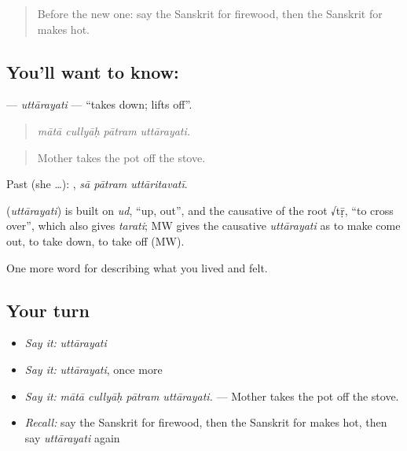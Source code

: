 \label{lesson:SA-C511-uttarayati}



\begin{quote}
Before the new one: say the Sanskrit for firewood, then the Sanskrit for makes hot.
\end{quote}

\subsection*{You'll want to know: }
\textbf{} — \emph{uttārayati} — \textquotedblleft{}takes down; lifts off\textquotedblright{}.

\begin{quote}
   
\end{quote}

\begin{quote}
\emph{mātā cullyāḥ pātram uttārayati.}
\end{quote}

\begin{quote}
Mother takes the pot off the stove.
\end{quote}

Past (she …):   , \emph{sā pātram uttāritavatī}.

\begin{cousinweb}
\textbf{} (\emph{uttārayati}) is built on \emph{ud}, \textquotedblleft{}up, out\textquotedblright{}, and the causative of the root √tṝ, \textquotedblleft{}to cross over\textquotedblright{}, which also gives \emph{tarati}; MW gives the causative \emph{uttārayati} as to make come out, to take down, to take off (MW).
\end{cousinweb}

\begin{grammarlens}[title={What you've built}]
One more word for describing what you lived and felt.
\end{grammarlens}

\subsection*{Your turn}
\begin{itemize}
\raggedright
  \item \emph{Say it:} \emph{uttārayati}
  \item \emph{Say it:} \emph{uttārayati}, once more
  \item \emph{Say it:} \emph{mātā cullyāḥ pātram uttārayati.} — Mother takes the pot off the stove.
  \item \emph{Recall:} say the Sanskrit for firewood, then the Sanskrit for makes hot, then say \emph{uttārayati} again
\end{itemize}

